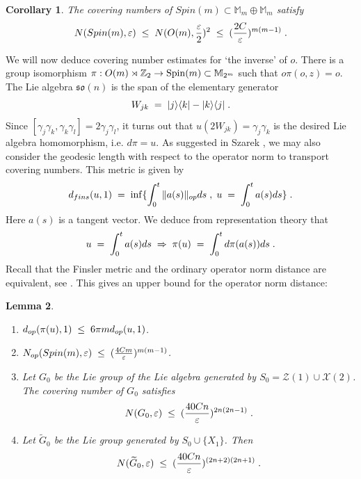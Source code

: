 \documentclass[12pt, a4-paper]{amsart}
\numberwithin{equation}{section}
\newcommand{\kl}{\pl \le \pl}
\newcommand{\lel}{\pl = \pl}
\newcommand{\zz}{{\mathbb Z}}
\newcommand{\pl}{\hspace{.1cm}}
\newcommand{\ran}{\rangle}
\newcommand{\lan}{\langle}
\newcommand{\eps}{\varepsilon}
\newcommand{\mz}{{\mathbb M}}
\newtheorem{lemma}{Lemma}[section]
\newtheorem{cor}[lemma]{Corollary}
\newcommand{\luke}[1]{\textcolor{cyan}{(\textit{#1})}}
\begin{document}
\begin{cor} The covering numbers of $Spin(m)\subset \mz_m\oplus \mz_m$ satisfy 
 \[ N(Spin(m),\eps) \kl N(O(m),\frac{\eps}{2})^2\kl (\frac{2C}{\eps})^{m(m-1)} \pl .\]
\end{cor} 
We will now deduce covering number estimates for `the inverse' of $o$. There is a group isomorphism  $\pi:O(m)\rtimes \zz_2\to {\rm Spin}(m)\subset \mz_{2^m}$ such that $o\pi(o,z)=o$. The Lie algebra $\mathfrak{so}(n)$ is the span of the elementary generator 
 \[ W_{jk} \lel |j\ran\lan k| - |k\ran\lan j| \pl. \]
Since $[\gamma_j\gamma_k,\gamma_k\gamma_l]=2\gamma_j\gamma_l$, it turns out that $u(2W_{jk})=\gamma_j\gamma_k$  is the desired Lie algebra homomorphism, i.e. $d\pi=u$.   As suggested  in Szarek \cite{Szarek1998MetricSpaces}, we may also consider the geodesic length with respect to the operator norm to transport covering numbers. This metric is given by  
 \[ d_{fins}(u,1) \lel \inf\{\int_0^t \|a(s)\|_{op} ds \pl ,\pl u\lel \int_0^t a(s) ds\} \pl .\] 
Here $a(s)$ is a tangent vector. We deduce from representation theory  that 
  \[ u \lel \int_0^t a(s) ds \pl \Rightarrow \pl \pi(u) \lel \int_0^t  d\pi(a(s)) ds  \pl. \] 
Recall that the Finsler metric and the ordinary operator norm distance are equivalent, see \cite{Szarek1998MetricSpaces}. 
This gives an upper bound for the operator norm distance:
\begin{lemma}\label{covspin}
 \begin{enumerate}
 \item[i)] $d_{op}(\pi(u),1)\kl 6\pi m d_{op}(u,1)$.
 \item[ii)] $N_{op}(Spin(m),\eps)\kl (\frac{4Cm}{\eps})^{m(m-1)}$.
 \item[iii)] Let $G_0$ be the Lie group of the Lie algebra generated by  $S_0=\mathcal{Z}(1)\cup \mathcal{X}(2)$. The covering number of $G_0$ satisfies  
 \[ N(G_0,\eps) \kl (\frac{40Cn}{\eps})^{2n(2n-1)} \pl .\] 
 \item[iv)] Let $\widetilde{G}_0$ %
 be the Lie group generated by $S_0\cup \{X_1\}$. Then 
  \[ N(\widetilde{G}_0,\eps) \kl (\frac{40Cn}{\eps})^{(2n+2)(2n+1)} \pl .\] 
 \end{enumerate}
\end{lemma}    
\end{document}
